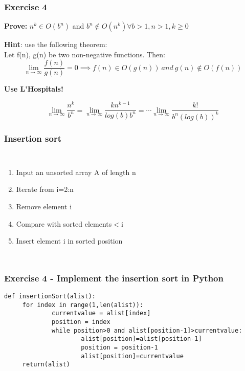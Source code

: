 \documentclass{beamer}
\begin{document}
\begin{frame}[noframenumbering]
\frametitle{Exercise 4}
\textbf{Prove:} $n^{k} \in O(b^{n})$ and $b^{n} 	\notin O(n^{k}) \forall b> 1, n>1, k\geq 0$ \\
 
 \begin{center}
{\color{blue} \textbf{Hint}: use the following theorem: \\

Let f(n), g(n) be two non-negative functions. Then: $$\lim_{n \to \infty} \frac{f(n)}{g(n)} = 0 \implies f (n) \in O(g(n)) \ and \ g(n) 	\notin O(f(n))$$ }
\end{center}
\textbf{Use L'Hospitals! }

$$\lim_{n \to \infty}  \frac{n^{k}}{b^{n}}= \lim_{n \to \infty}  \frac{kn^{k-1}}{log(b)b^{n}}
= \cdots \lim_{n \to \infty} \frac{k!} {b^{n}(log (b))^{k}}$$

\end{frame}

 

\begin{frame}
\frametitle{Insertion sort}

\begin{columns}[c]  
 
\begin{enumerate}
\item Input an unsorted array A of length n
\item Iterate from i=2:n
\item Remove element i
\item Compare with sorted elements$<$i
\item Insert element i in sorted position
\end{enumerate}

\end{columns}
 

\end{frame}



\begin{frame}[fragile]
\frametitle{Exercise 4 - Implement the insertion sort in Python}


 {\small 
\begin{verbatim}
def insertionSort(alist):
     for index in range(1,len(alist)):
             currentvalue = alist[index]  
             position = index
             while position>0 and alist[position-1]>currentvalue:
                     alist[position]=alist[position-1] 
                     position = position-1 
                     alist[position]=currentvalue 
     return(alist)
\end{verbatim}}
\end{frame}
\end{document}
